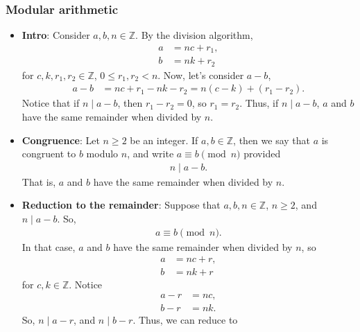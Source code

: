 \documentclass{report}
\begin{document}
    \subsubsection{Modular arithmetic}
    \begin{itemize}
        \item \textbf{Intro}: Consider $a,b,n \in \mathbb{Z}$. By the division algorithm, 
            \begin{align*}
                a &= nc + r_{1},  \\
                b &= nk + r_{2}
            \end{align*}
            for $c,k, r_{1}, r_{2} \in \mathbb{Z}$, $0 \leq r_{1}, r_{2} < n$. Now, let's consider $a-b$,
            \begin{align*}
                a - b &= nc + r_{1} - nk - r_{2} = n(c-k) + (r_{1} - r_{2})
            .\end{align*}
            Notice that if $n \mid a-b$, then $r_{1} - r_{2} = 0$, so $r_{1} = r_{2}$. Thus, if $n \mid a-b$, $a$ and $b$ have the same remainder when divided by $n$.
        \item \textbf{Congruence}: Let $n \geq 2$ be an integer. If $a,b \in \mathbb{Z}$, then we say that $a$ is congruent to $b$ modulo $n$, and write $a \equiv b \pmod{n}$ provided 
            \begin{align*}
                n \mid a - b 
            .\end{align*}
            That is, $a$ and $b$ have the same remainder when divided by $n$.
        \item \textbf{Reduction to the remainder}: Suppose that $a,b,n \in \mathbb{Z}$, $n \geq 2$, and $n \mid a-b$. So,
            \begin{align*}
                a \equiv b \pmod{n}
            .\end{align*}
            In that case, $a$ and $b$ have the same remainder when divided by $n$, so
            \begin{align*}
                a &= nc + r, \\
                b &= nk + r
            \end{align*}
            for $c,k \in \mathbb{Z}$. Notice
            \begin{align*}
                a - r &= nc, \\
                b - r &= nk
            .\end{align*}
            So, $n \mid a-r$, and $n \mid b-r$. Thus, we can reduce to
            \begin{align*}

\end{align*}
\end{itemize}
\end{document}
